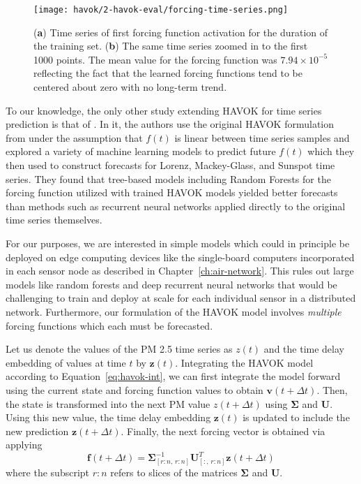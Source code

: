 \begin{figure}[h]
  \vspace{-1cm}
  \centering
  \texttt{[image: havok/2-havok-eval/forcing-time-series.png]}
  \caption{(\textbf{a}) Time series of first forcing function activation for the
    duration of the training set. (\textbf{b}) The same time series zoomed in to
    the first 1000 points. The mean value for the forcing function was $7.94\times
    10^{-5}$ reflecting the fact that the learned forcing functions tend to be
    centered about zero with no long-term trend.}
  \label{fig:pm-forcing-time-series}
\end{figure}


To our knowledge, the only other study extending HAVOK for time series
prediction is that of \cite{havok-ml}. In it, the authors use the original
HAVOK formulation from \cite{brunton-havok-orig} under the assumption that
$f(t)$ is linear between time series samples and explored a variety of machine
learning models to predict future $f(t)$ which they then used to construct
forecasts for Lorenz, Mackey-Glass, and Sunspot time series. They found that
tree-based models including Random Forests for the forcing function utilized
with trained HAVOK models yielded better forecasts than methods such
as recurrent neural networks applied directly to the original time series themselves.

For our purposes, we are interested in simple models which could in principle be
deployed on edge computing devices like the single-board computers incorporated
in each sensor node as described in Chapter~\ref{ch:air-network}. This rules out
large models like random forests and deep recurrent neural networks  that would
be challenging to train and deploy at scale for each individual sensor in a
distributed network. Furthermore, our formulation of the HAVOK model involves
\textit{multiple} forcing functions which each must be forecasted.

Let us denote the values of the PM 2.5 time series as $z(t)$ and the time delay
embedding of values at time $t$ by $\mathbf{z}(t)$. Integrating the HAVOK
model according to Equation~\ref{eq:havok-int}, we can
first integrate the model forward using the current state and forcing
function values to obtain $\mathbf{v}(t+\Delta t)$. Then, the state is
transformed into the next PM value $z(t+\Delta t)$ using $\mathbf{\Sigma}$ and
$\mathbf{U}$. Using this new value, the time delay embedding $\mathbf{z}(t)$ is
updated to include the new prediction $\mathbf{z}(t+\Delta t)$.
Finally, the next forcing vector is obtained via applying
\begin{equation}
  \mathbf{f}(t + \Delta t) = \mathbf{\Sigma}_{[r:n,\, r:n]}^{-1}\mathbf{U}_{[:,\, r:n]}^T\mathbf{z}(t+\Delta t)
\end{equation}
where the subscript $r:n$ refers to slices of the matrices $\mathbf{\Sigma}$ and $\mathbf{U}$.

